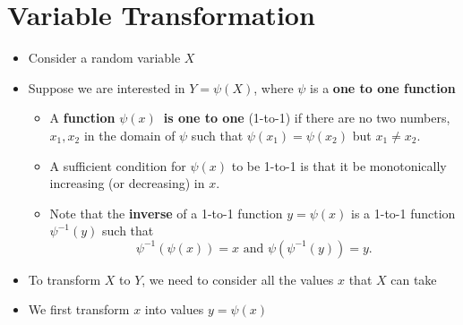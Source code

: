 \documentclass[notes=show,smaller,handout]{beamer}\usepackage[]{graphicx}\usepackage[]{color}
\newenvironment{stepitemize}{\begin{itemize}[<+->]}{\end{itemize} }
\begin{document}
\section{Variable Transformation}


\begin{frame}{\secname}
  \begin{stepitemize}
  \item Consider a random variable $X$

  \item Suppose we are interested in $Y=\psi(X)$, where $\psi $ is a \textbf{%
  one to one function}

  \begin{stepitemize}
  \item A \textbf{function }$\psi \left( x\right) $\textbf{\ is one to one}
  (1-to-1) if there are no two numbers, $x_{1},x_{2}$ in the domain of $\psi $
  such that $\psi \left( x_{1}\right) =\psi \left( x_{2}\right) $ but $%
  x_{1}\neq x_{2}$.

  \item A sufficient condition for $\psi \left( x\right) $ to be 1-to-1 is
  that it be monotonically increasing (or decreasing) in $x$.

  \item Note that the \textbf{inverse} of a 1-to-1 function $y=\psi \left(
  x\right) $ is a 1-to-1 function $\psi^{-1}\left( y\right) $ such that
  \begin{equation*}
  \psi ^{-1}\left( \psi \left( x\right) \right) =x\text{ and }\psi \left( \psi
  ^{-1}\left( y\right) \right) =y.
  \end{equation*}
  \end{stepitemize}

  \item To transform $X$ to $Y$, we need to consider all the values $x$ that $%
  X $ can take

  \item We first transform $x$ into values $y=\psi (x)$
  \end{stepitemize}
\end{frame}
\end{document}
